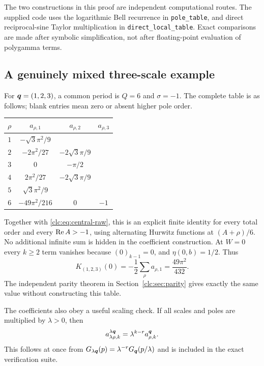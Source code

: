 The two constructions in this proof are independent computational
routes. The supplied code uses the logarithmic Bell recurrence in
\texttt{pole\_table}, and direct reciprocal-sine Taylor multiplication in
\texttt{direct\_local\_table}. Exact comparisons are made after symbolic
simplification, not after floating-point evaluation of polygamma terms.

\subsection{A genuinely mixed three-scale example}
For $\boldsymbol q=(1,2,3)$, a common period is $Q=6$ and $\sigma=-1$.
The complete table is as follows; blank entries mean zero or absent
higher pole order.
\begin{center}
\begin{tabular}{c c c c}
\toprule
$\rho$ & $a_{\rho,1}$ & $a_{\rho,2}$ & $a_{\rho,3}$\\
\midrule
$1$ & $-\sqrt3\pi^2/9$ & &\\
$2$ & $-2\pi^2/27$ & $-2\sqrt3\pi/9$ &\\
$3$ & $0$ & $-\pi/2$ &\\
$4$ & $2\pi^2/27$ & $-2\sqrt3\pi/9$ &\\
$5$ & $\sqrt3\pi^2/9$ & &\\
$6$ & $-49\pi^2/216$ & $0$ & $-1$\\
\bottomrule
\end{tabular}
\end{center}
Together with \eqref{clc:eq:central-raw}, this is an explicit finite
identity for every total order and every $\operatorname{Re} A>-1$, using alternating
Hurwitz functions at $(A+\rho)/6$. No additional infinite sum is hidden
in the coefficient construction.
At $W=0$ every $k\ge2$ term vanishes because $(0)_{k-1}=0$, and
$\eta(0,b)=1/2$. Thus
\begin{equation}\label{clc:eq:123zero}
 K_{(1,2,3)}(0)=-\frac12\sum_\rho a_{\rho,1}
 =\frac{49\pi^2}{432}.
\end{equation}
The independent parity theorem in Section~\ref{clc:sec:parity} gives
exactly the same value without constructing this table.

The coefficients also obey a useful scaling check. If all scales and
poles are multiplied by $\lambda>0$, then
\begin{equation}\label{clc:eq:coef-scaling}
 a^{\lambda\boldsymbol q}_{\lambda\rho,k}
 =\lambda^{k-r}a^{\boldsymbol q}_{\rho,k}.
\end{equation}
This follows at once from
$G_{\lambda\boldsymbol q}(p)=\lambda^{-r}G_{\boldsymbol q}(p/\lambda)$ and is included
in the exact verification suite.
